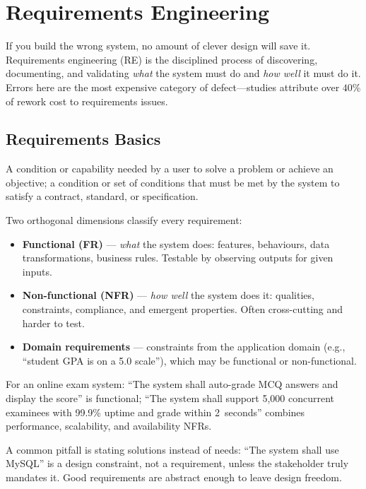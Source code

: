 \chapter{Requirements Engineering}
\label{ch:requirements}

If you build the wrong system, no amount of clever design will save it. Requirements engineering (RE) is the disciplined process of discovering, documenting, and validating \emph{what} the system must do and \emph{how well} it must do it. Errors here are the most expensive category of defect---studies attribute over $40\%$ of rework cost to requirements issues.

\section{Requirements Basics}

\begin{definition}[Requirement]
A condition or capability needed by a user to solve a problem or achieve an objective; a condition or set of conditions that must be met by the system to satisfy a contract, standard, or specification.
\end{definition}

Two orthogonal dimensions classify every requirement:

\begin{itemize}
    \item \textbf{Functional (FR)} --- \emph{what} the system does: features, behaviours, data transformations, business rules. Testable by observing outputs for given inputs.
    \item \textbf{Non-functional (NFR)} --- \emph{how well} the system does it: qualities, constraints, compliance, and emergent properties. Often cross-cutting and harder to test.
    \item \textbf{Domain requirements} --- constraints from the application domain (e.g., ``student GPA is on a 5.0 scale''), which may be functional or non-functional.
\end{itemize}

\begin{example}
For an online exam system: ``The system shall auto-grade MCQ answers and display the score'' is functional; ``The system shall support 5{,}000 concurrent examinees with 99.9\% uptime and grade within 2~seconds'' combines performance, scalability, and availability NFRs.
\end{example}

A common pitfall is stating solutions instead of needs: ``The system shall use MySQL'' is a design constraint, not a requirement, unless the stakeholder truly mandates it. Good requirements are abstract enough to leave design freedom.

